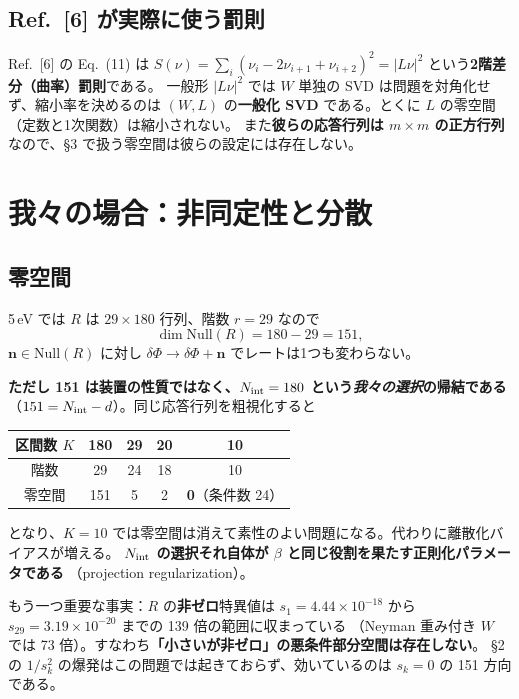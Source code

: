 \documentclass[11pt,a4paper]{ltjsarticle}
\newcommand{\dP}{\delta\Phi}
\newcommand{\Nint}{N_{\rm int}}
\begin{document}
\subsection{Ref.~[6] が実際に使う罰則}
Ref.~[6] の Eq.~(11) は
$S(\nu)=\sum_i(\nu_i-2\nu_{i+1}+\nu_{i+2})^2=|L\nu|^2$ という\textbf{2階差分（曲率）罰則}である。
一般形 $|L\nu|^2$ では $W$ 単独の SVD は問題を対角化せず、縮小率を決めるのは
$(W,L)$ の\textbf{一般化 SVD} である。とくに $L$ の零空間（定数と1次関数）は縮小されない。
また\textbf{彼らの応答行列は $m\times m$ の正方行列}なので、\S3 で扱う零空間は彼らの設定には存在しない。

\section{我々の場合：非同定性と分散}

\subsection{零空間}
5\,eV では $R$ は $29\times180$ 行列、階数 $r=29$ なので
\begin{equation}
\dim\mathrm{Null}(R)=180-29=151,
\end{equation}
$\bm n\in\mathrm{Null}(R)$ に対し $\dP\to\dP+\bm n$ でレートは1つも変わらない。

\textbf{ただし 151 は装置の性質ではなく、$\Nint=180$ という\emph{我々の選択}の帰結である}
（$151=\Nint-d$）。同じ応答行列を粗視化すると
\begin{center}\small
\begin{tabular}{ccccc}
\toprule
区間数 $K$ & 180 & 29 & 20 & 10\\
\midrule
階数 & 29 & 24 & 18 & 10\\
零空間 & 151 & 5 & 2 & \textbf{0}（条件数 24）\\
\bottomrule
\end{tabular}
\end{center}
となり、$K=10$ では零空間は消えて素性のよい問題になる。代わりに離散化バイアスが増える。
\textbf{$\Nint$ の選択それ自体が $\beta$ と同じ役割を果たす正則化パラメータである}
（projection regularization）。

もう一つ重要な事実：$R$ の\textbf{非ゼロ}特異値は
$s_1=4.44\times10^{-18}$ から $s_{29}=3.19\times10^{-20}$ までの 139 倍の範囲に収まっている
（Neyman 重み付き $W$ では 73 倍）。すなわち\textbf{「小さいが非ゼロ」の悪条件部分空間は存在しない}。
\S2 の $1/s_k^2$ の爆発はこの問題では起きておらず、効いているのは $s_k=0$ の 151 方向である。
\end{document}
